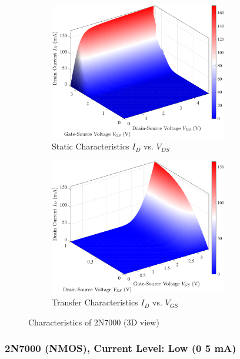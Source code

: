\documentclass[UTF8]{article}
\begin{document}
\begin{figure}[H]\centering
\begin{subfigure}[b]{0.5\columnwidth}\centering
    \includegraphics[height=170pt]{LCE-04-场效应管/assets/2N7000/2N7000 (NMOS) [onsemi, KH32] 3D current high/2025-04-24_21-05-11.pdf}
    \caption{Static Characteristics $I_D$ vs. $V_{DS}$}
\end{subfigure}\hfill
\begin{subfigure}[b]{0.5\columnwidth}\centering
    \includegraphics[height=170pt]{LCE-04-场效应管/assets/2N7000/2N7000 (NMOS) [onsemi, KH32] 3D current high/2025-04-24_21-05-16.pdf}
    \caption{Transfer Characteristics $I_D$ vs. $V_{GS}$}
\end{subfigure}
\caption{Characteristics of 2N7000 (3D view)}
\end{figure}


\subsubsection{2N7000 (NMOS), Current Level: Low (0 \~ 5 mA)}
\end{document}
